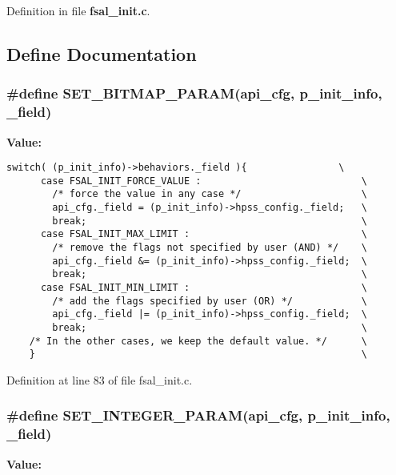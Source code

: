 Definition in file {\bf fsal\_\-init.c}.

\subsection{Define Documentation}
\subsubsection{\setlength{\rightskip}{0pt plus 5cm}\#define SET\_\-BITMAP\_\-PARAM(api\_\-cfg, p\_\-init\_\-info, \_\-field)}\label{fsal__init_8c_a0}


{\bf Value:}

\footnotesize\begin{verbatim}switch( (p_init_info)->behaviors._field ){                \
      case FSAL_INIT_FORCE_VALUE :                            \
        /* force the value in any case */                     \
        api_cfg._field = (p_init_info)->hpss_config._field;   \
        break;                                                \
      case FSAL_INIT_MAX_LIMIT :                              \
        /* remove the flags not specified by user (AND) */    \
        api_cfg._field &= (p_init_info)->hpss_config._field;  \
        break;                                                \
      case FSAL_INIT_MIN_LIMIT :                              \
        /* add the flags specified by user (OR) */            \
        api_cfg._field |= (p_init_info)->hpss_config._field;  \
        break;                                                \
    /* In the other cases, we keep the default value. */      \
    }                                                         \
\end{verbatim}\normalsize 


Definition at line 83 of file fsal\_\-init.c.
\subsubsection{\setlength{\rightskip}{0pt plus 5cm}\#define SET\_\-INTEGER\_\-PARAM(api\_\-cfg, p\_\-init\_\-info, \_\-field)}\label{fsal__init_8c_a1}


{\bf Value:}

